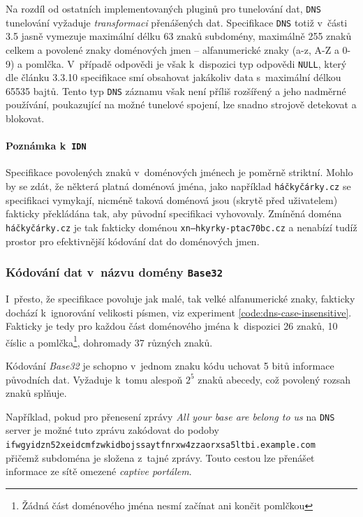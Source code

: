 \documentclass[thesis=M,czech]{FITthesis}[2012/10/20]
\begin{document}
    Na rozdíl od ostatních implementovaných pluginů pro tunelování dat, \texttt{DNS} tunelování vyžaduje \textit{transformaci} přenášených dat. Specifikace \texttt{DNS} \cite[RFC 1035]{rfc1035} totiž v~části 3.5 jasně vymezuje maximální délku 63 znaků subdomény, maximálně 255 znaků celkem a povolené znaky doménových jmen -- alfanumerické znaky (a-z, A-Z a 0-9) a pomlčka. V~případě odpovědi je však k~dispozici typ odpovědi \texttt{NULL}, který dle článku 3.3.10 specifikace \cite[RFC 1035]{rfc1035} smí obsahovat jakákoliv data s~maximální délkou 65535 bajtů. Tento typ \texttt{DNS} záznamu však není příliš rozšířený a jeho nadměrné používání, poukazující na možné tunelové spojení, lze snadno strojově detekovat a blokovat.
    
    \paragraph{Poznámka k~\texttt{IDN}} Specifikace povolených znaků v~doménových jménech je poměrně striktní. Mohlo by se zdát, že některá platná doménová jména, jako například \texttt{háčkyčárky.cz} se specifikaci vymykají, nicméně taková doménová jsou (skrytě před uživatelem) fakticky překládána tak, aby původní specifikaci vyhovovaly. Zmíněná doména \texttt{háčkyčárky.cz} je tak fakticky doménou \texttt{xn--hkyrky-ptac70bc.cz} a nenabízí tudíž prostor pro efektivnější kódování dat do doménových jmen.
    
    \subsubsection{Kódování dat v~názvu domény \texttt{Base32}}
    
    I~přesto, že specifikace povoluje jak malé, tak velké alfanumerické znaky, fakticky dochází k~ignorování velikosti písmen, viz experiment \ref{code:dns-case-insensitive}. Fakticky je tedy pro každou část doménového jména k~dispozici 26 znaků, 10 číslic a pomlčka\footnote{Žádná část doménového jména nesmí začínat ani končit pomlčkou}, dohromady 37 různých znaků.
    
    Kódování \textit{Base32} je schopno v~jednom znaku kódu uchovat 5 bitů informace původních dat. Vyžaduje k~tomu alespoň $2^5$ znaků abecedy, což povolený rozsah znaků splňuje.
    
    Například, pokud pro přenesení zprávy \textit{All your base are belong to us} na \texttt{DNS} server je možné tuto zprávu zakódovat do podoby\\ 
        \texttt{ifwgyidzn52xeidcmfzwkidbojssaytfnrxw4zzaorxsa5ltbi.example.com} \\
    přičemž subdoména je složena z~tajné zprávy. Touto cestou lze přenášet informace ze sítě omezené \textit{captive portálem}.
    
\end{document}

